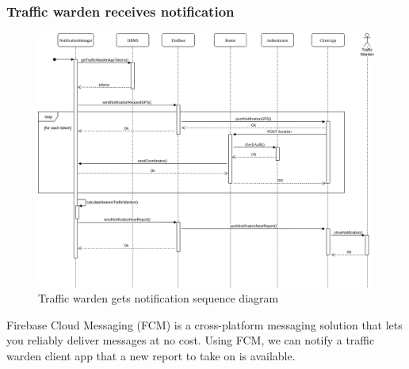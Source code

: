 \documentclass{article}
\begin{document}
\subsubsection{Traffic warden receives notification}
\label{sec:notification}
\begin{figure}[!htb]
\centering
	\includegraphics[width=1.0\textwidth]{images/notification-sequence.png}
	\caption{Traffic warden gets notification sequence diagram}
	\label{fig:notifaction-sequence}
\end{figure}
Firebase Cloud Messaging (FCM) is a cross-platform messaging solution that lets you reliably deliver messages at no cost.
Using FCM, we can notify a traffic warden client app that a new report to take on is available.

\newpage
\end{document}
